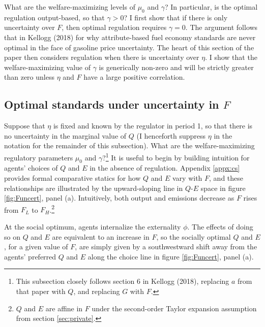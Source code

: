 \documentclass[12pt]{article}
\begin{document}
What are the welfare-maximizing levels of $\mu_0$ and $\gamma$? In particular, is the optimal regulation output-based, so that $\gamma>0$? I first show that if there is only uncertainty over $F$, then optimal regulation requires $\gamma=0$. The argument follows that in Kellogg (2018) for why attribute-based fuel economy standards are never optimal in the face of gasoline price uncertainty. The heart of this section of the paper then considers regulation when there is uncertainty over $\eta$. I show that the welfare-maximizing value of $\gamma$ is generically non-zero and will be strictly greater than zero unless $\eta$ and $F$ have a large positive correlation.


\subsection{Optimal standards under uncertainty in $F$} \label{sec:Funcert}

Suppose that $\eta$ is fixed and known by the regulator in period 1, so that there is no uncertainty in the marginal value of $Q$ (I henceforth suppress $\eta$ in the notation for the remainder of this subsection). What are the welfare-maximizing regulatory parameters $\mu_0$ and $\gamma$?\footnote{This subsection closely follows section 6 in Kellogg (2018), replacing $a$ from that paper with $Q$, and replacing $G$ with $F$.} It is useful to begin by building intuition for agents' choices of $Q$ and $E$ in the absence of regulation. Appendix \ref{appx:cs} provides formal comparative statics for how $Q$ and $E$ vary with $F$, and these relationships are illustrated by the upward-sloping line in $Q$-$E$ space in figure \ref{fig:Funcert}, panel (a). Intuitively, both output and emissions decrease as $F$ rises from $F_L$ to $F_H$.\footnote{$Q$ and $E$ are affine in $F$ under the second-order Taylor expansion assumption from section \ref{sec:private}.}

At the social optimum, agents internalize the externality $\phi$. The effects of doing so on $Q$ and $E$ are equivalent to an increase in $F$, so the socially optimal $Q$ and $E$, for a given value of $F$, are simply given by a southwestward shift away from the agents' preferred $Q$ and $E$ along the choice line in figure \ref{fig:Funcert}, panel (a).
\end{document}
